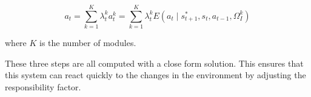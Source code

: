 \begin{equation}
\label{e_mix}
a_t = \sum_{k=1}^K{\lambda_t^k a_t^k} = \sum_{k=1}^K{\lambda_t^k E\left({a_t \mid s^*_{t+1},s_t, a_{t-1}, \Omega^k_I}\right)}
\end{equation}

where $K$ is the number of modules.

These three steps are all computed with a close form solution. This ensures that this system can react quickly to the changes in the environment by adjusting the responsibility factor.



